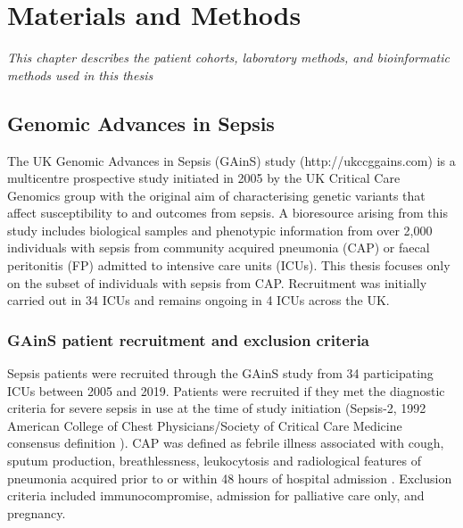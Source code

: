 \chapter{Materials and Methods}
\label{ch:MandM}
\textit{This chapter describes the patient cohorts, laboratory methods, and bioinformatic methods used in this thesis}

\startcontents[chapters]{\vspace{-1.4cm}}
\singlespacing
{}
\doublespacing

\section{Genomic Advances in Sepsis}
The UK Genomic Advances in Sepsis (GAinS) study (http://ukccggains.com) is a multicentre prospective study initiated in 2005 by the UK Critical Care Genomics group with the original aim of characterising genetic variants that affect susceptibility to and outcomes from sepsis. A bioresource arising from this study includes biological samples and phenotypic information from over 2,000 individuals with sepsis from community acquired pneumonia (CAP) or faecal peritonitis (FP) admitted to intensive care units (ICUs). This thesis focuses only on the subset of individuals with sepsis from CAP. Recruitment was initially carried out in 34 ICUs and remains ongoing in 4 ICUs across the UK.

\subsection{GAinS patient recruitment and exclusion criteria}
Sepsis patients were recruited through the GAinS study from 34 participating ICUs between 2005 and 2019. Patients were recruited if they met the diagnostic criteria for severe sepsis in use at the time of study initiation (Sepsis-2, 1992 American College of Chest Physicians/Society of Critical Care Medicine consensus definition \parencite{Bone1992}). CAP was defined as febrile illness associated with cough, sputum production, breathlessness, leukocytosis and radiological features of pneumonia acquired prior to or within 48 hours of hospital admission \parencite{Lim2009}. Exclusion criteria included immunocompromise, admission for palliative care only, and pregnancy.

